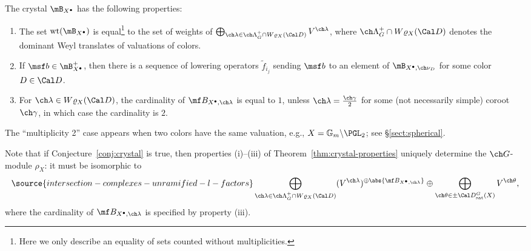 \begin{thm}
\notready \label{thm:crystal-properties}
The crystal $\mB_{X^\bullet}$ has the following properties:
\begin{enumerate}
\item The set $\mathrm{wt}(\mB_{X^\bullet})$ is equal\footnote{Here we only describe an equality of sets counted without multiplicities.} to the set of weights of
$\bigoplus_{\ch\lambda \in \ch\Lambda^+_G \cap W\varrho_X(\Cal D)} V^{\ch\lambda}$,
where $\ch\Lambda^+_G \cap W\varrho_X(\Cal D)$ denotes the dominant Weyl translates of valuations
of colors.
\item If $\msf b \in \mB_{X^\bullet}^+$, then
there is a sequence of lowering operators $\tilde f_{i_j}$ sending $\msf b$ to an element of
$\mB_{X^\bullet,\ch\nu_D}$ for some color $D\in \Cal D$.
\item For $\ch\lambda \in W\varrho_X(\Cal D)$,
the cardinality of $\mf B_{X^\bullet,\ch\lambda}$ is equal to $1$, unless $\ch\lambda =\frac{\ch\gamma}{2}$ for some (not necessarily simple) coroot $\ch\gamma$, in which case the cardinality is $2$.
\end{enumerate}
\end{thm}



\begin{rem}
\notready
 The ``multiplicity 2'' case appears when two colors have the same valuation, e.g., $X = \mathbb G_m\backslash\PGL_2$; see \S \ref{sect:spherical}.
\end{rem}



\begin{rem}
\notready \label{rem:conj}
Note that if Conjecture~\ref{conj:crystal} is true, then properties (i)--(iii) of
Theorem~\ref{thm:crystal-properties} uniquely determine the $\ch G$-module $\rho_X$: it must
be isomorphic to
\begin{equation} \label{e:conjVX}
\source{intersection-complexes-unramified-l-factors}
 \bigoplus_{\ch\lambda \in \ch\Lambda^+_G \cap W\varrho_X(\Cal D)}
(V^{\ch\lambda})^{\oplus \abs{\mf B_{X^\bullet,\ch\lambda}}} \oplus
\bigoplus_{\ch\theta \in \pm\Cal D^G_{\mathrm{sat}}(X)} V^{\ch\theta},
\end{equation}
where the cardinality of $\mf B_{X^\bullet,\ch\lambda}$ is specified by property (iii).
\end{rem}


